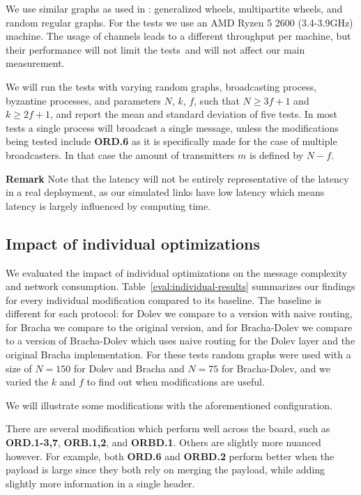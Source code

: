 We use similar graphs as used in \cite{bonomi2021practical,bonomi2019multihop}: generalized wheels, multipartite wheels, and random regular graphs. For the tests we use an AMD Ryzen 5 2600 (3.4-3.9GHz) machine. The usage of channels leads to a different throughput per machine, but their performance will not limit the tests~\citationneeded and will not affect our main measurement.

We will run the tests with varying random graphs, broadcasting process, byzantine processes, and parameters $N$, $k$, $f$, such that $N \ge 3f+1$ and $k \ge 2f+1$, and report the mean and standard deviation of five tests. In most tests a single process will broadcast a single message, unless the modifications being tested include \textbf{ORD.6} as it is specifically made for the case of multiple broadcasters. In that case the amount of transmitters $m$ is defined by $N-f$.

\textbf{Remark}
Note that the latency will not be entirely representative of the latency in a real deployment, as our simulated links have low latency which means latency is largely influenced by computing time. 

\subsection{Impact of individual optimizations}
We evaluated the impact of individual optimizations on the message complexity and network consumption. Table~\ref{eval:individual-results} summarizes our findings for every individual modification compared to its baseline. The baseline is different for each protocol: for Dolev we compare to a version with naive routing, for Bracha we compare to the original version, and for Bracha-Dolev we compare to a version of Bracha-Dolev which uses naive routing for the Dolev layer and the original Bracha implementation. For these tests random graphs were used with a size of $N=150$ for Dolev and Bracha and $N=75$ for Bracha-Dolev, and we varied the $k$ and $f$ to find out when modifications are useful. 

We will illustrate some modifications with the aforementioned configuration.

There are several modification which perform well across the board, such as \textbf{ORD.1-3,7}, \textbf{ORB.1,2}, and \textbf{ORBD.1}. Others are slightly more nuanced however. For example, both \textbf{ORD.6} and \textbf{ORBD.2} perform better when the payload is large since they both rely on merging the payload, while adding slightly more information in a single header. 


